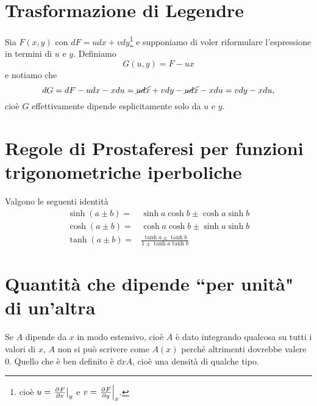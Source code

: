\section{Trasformazione di Legendre}
Sia $F(x,y)$ con $dF=udx+vdy$\footnote{cio\`e $u=\ppb xFy$ e $v=\ppb yFx$.} e supponiamo di voler riformulare l'espressione in termini di $u$ e $y$. Definiamo 
\[G(u,y)=F-ux\]
e notiamo che
\[dG=dF-udx-xdu=\cancel{udx}+vdy-\cancel{udx}-xdu=vdy-xdu,\]
cio\`e $G$ effettivamente dipende esplicitamente solo da $u$ e $y$.


\section{Regole di Prostaferesi per funzioni trigonometriche iperboliche}\label{SommaTangenteIperbolica}
Valgono le seguenti identit\`a
\begin{align*}
\sinh(a\pm b)=&\sinh a\cosh b \pm \cosh a\sinh b\\
\cosh(a\pm b)=&\cosh a\cosh b\pm \sinh a\sinh b\\
\tanh(a\pm b)=&\frac{\tanh a\pm \tanh b}{1\pm \tanh a \tanh b}
\end{align*}


\section{Quantit\`a che dipende ``per unit\`a" di un'altra}
\begin{remark}
Se $A$ dipende da $x$ in modo estensivo, cio\`e $A$ \`e dato integrando qualcosa su tutti i valori di $x$, $A$ non si pu\`o scrivere come $A(x)$ perch\'e altrimenti dovrebbe valere $0$. Quello che \`e ben definito \`e $\dd xA$, cio\`e una densit\`a di qualche tipo.
\end{remark}


